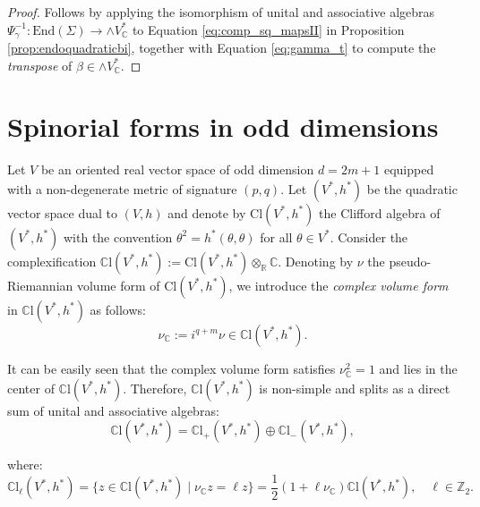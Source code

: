 \documentclass[10pt,a4paper,twoside,reqno]{amsart}
\theoremstyle{plain}
\theoremstyle{definition}
\theoremstyle{remark}
\newcommand{\End}{\mathrm{End}}
\def\C{\mathbb{C}}
\def\R{\mathbb{R}}
\def\R{\mathbb{R}}
\begin{document}
\begin{proof}
Follows by applying the isomorphism of unital and associative algebras $\Psi_{\gamma}^{-1}\colon \End(\Sigma) \to \wedge V^{\ast}_{\C}$ to Equation \eqref{eq:comp_sq_mapsII} in Proposition \ref{prop:endoquadraticbi}, together with Equation \eqref{eq:gamma_t} to compute the \emph{transpose} of $\beta \in \wedge V_{\C}^{\ast}$.
\end{proof}


\section{Spinorial forms in odd dimensions}
\label{section:odd_forms}


Let $V$ be an oriented real vector space of odd dimension $d=2m+1$ equipped with a non-degenerate metric of signature $(p,q)$. Let $(V^*,h^*)$ be the quadratic vector space dual to $(V,h)$ and denote by $\mathrm{Cl}(V^*,h^*)$ the Clifford algebra of $(V^*,h^*)$ with the convention $\theta^2=h^*(\theta,\theta)$ for all $\theta\in V^*$. Consider the complexification $\C\mathrm{l}(V^*,h^*) := \mathrm{Cl}(V^*,h^*) \otimes_\R\C$. Denoting by $\nu$ the pseudo-Riemannian volume form of $\mathrm{Cl}(V^*,h^*)$, we introduce the \emph{complex volume form} in $\C\mathrm{l}(V^*,h^*)$ as follows:
\begin{equation*}
\nu_\C:=i^{q+m}\nu\in\C\mathrm{l}(V^*,h^*).
\end{equation*}

\noindent
It can be easily seen that the complex volume form satisfies $\nu_\C^2=1$ and lies in the center of $\C\mathrm{l}(V^*,h^*)$. Therefore, $\C\mathrm{l}(V^*,h^*)$ is non-simple and splits as a direct sum of unital and associative algebras: 
\begin{equation}
\label{eq:splitting_Clifford}
\C\mathrm{l}(V^*,h^*)=\C\mathrm{l}_+(V^*,h^*)\oplus\C\mathrm{l}_-(V^*,h^*),
\end{equation}

where: 
\begin{equation*}
\C\mathrm{l}_\ell(V^*,h^*)=\{z\in\C\mathrm{l}(V^*,h^*)\mid\nu_\C z=\ell z\}=\frac{1}{2}(1+\ell\nu_\C)\C\mathrm{l}(V^*,h^*),\quad\ell\in\mathbb{Z}_2.
\end{equation*}
\end{document}

